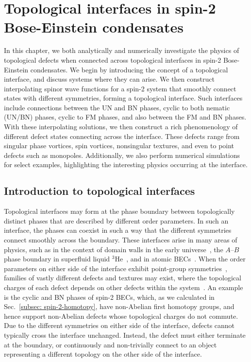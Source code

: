 \chapter{\label{chap: spin-2}
Topological interfaces in spin-2 Bose-Einstein condensates}
In this chapter, we both analytically and numerically investigate the physics
of topological defects when connected across topological interfaces in spin-2
Bose-Einstein condensates.
We begin by introducing the concept of a topological interface, and discuss
systems where they can arise.
We then construct interpolating spinor wave functions for a spin-2 system that
smoothly connect states with different symmetries, forming a topological
interface.
Such interfaces include connections between the UN and BN phases, cyclic to both
nematic (UN/BN) phases, cyclic to FM phases, and also between the FM and BN
phases.
With these interpolating solutions, we then construct a rich phenomenology of
different defect states connecting across the interface.
These defects range from singular phase vortices, spin vortices, nonsingular
textures, and even to point defects such as monopoles.
Additionally, we also perform numerical simulations for select examples,
highlighting the interesting physics occurring at the interface.

\section{Introduction to topological interfaces}
Topological interfaces may form at the phase boundary between
topologically distinct phases that are described by different order parameters.
In such an interface, the phases can coexist in such a way that the different
symmetries connect smoothly across the boundary.
These interfaces arise in many areas of physics, such as in the context of
domain walls in the early universe~\cite{Zeldovich1975,Kibble1976,Kibble1980},
the \(A\)--\(B\) phase boundary in superfluid liquid \(^3\)He~\cite{
    Osheroff1977,Yip1986,Salomaa1987,Finne2006,Bradley2008,Volovik2009}, and in
atomic BECs~\cite{Takeuchi2006,Kasamatsu2010,
    Borgh2012,Borgh2013, Borgh2014,Kaneda2014}.
When the order parameters on either side of the interface exhibit point-group
symmetries~\cite{Xiao2022}, families of vastly different defects
and textures may exist, where the topological charges of each defect depends
on other defects within the system~\cite{Poenaru1977, Mermin1979}.
An example is the cyclic and BN phases of spin-2 BECs, which, as we calculated
in Sec.~\ref{subsec: spin-2-homotopy}, have non-Abelian first homotopy groups,
and hence support non-Abelian defects whose topological charges do not commute.
Due to the different symmetries on either side of the interface, defects cannot
typically cross the interface unchanged.
Instead, the defect must either terminate at the boundary, or continuously
and non-trivially connect to an object representing a different topology on the
other side of the interface.

